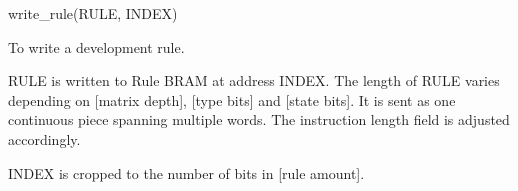 

\format
write\_rule(RULE, INDEX)

\purpose

To write a development rule.

\description

RULE is written to Rule BRAM at address INDEX.
The length of RULE varies depending on [matrix depth], [type bits] and [state bits].
It is sent as one continuous piece spanning multiple words.
The instruction length field is adjusted accordingly.

\notes

INDEX is cropped to the number of bits in [rule amount].
